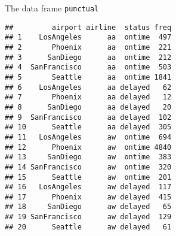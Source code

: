 \begin{frame}[fragile]{The data frame \texttt{punctual}}

  {\footnotesize
\begin{knitrout}
\color{fgcolor}\begin{kframe}
\begin{verbatim}
##         airport airline  status freq
## 1    LosAngeles      aa  ontime  497
## 2       Phoenix      aa  ontime  221
## 3      SanDiego      aa  ontime  212
## 4  SanFrancisco      aa  ontime  503
## 5       Seattle      aa  ontime 1841
## 6    LosAngeles      aa delayed   62
## 7       Phoenix      aa delayed   12
## 8      SanDiego      aa delayed   20
## 9  SanFrancisco      aa delayed  102
## 10      Seattle      aa delayed  305
## 11   LosAngeles      aw  ontime  694
## 12      Phoenix      aw  ontime 4840
## 13     SanDiego      aw  ontime  383
## 14 SanFrancisco      aw  ontime  320
## 15      Seattle      aw  ontime  201
## 16   LosAngeles      aw delayed  117
## 17      Phoenix      aw delayed  415
## 18     SanDiego      aw delayed   65
## 19 SanFrancisco      aw delayed  129
## 20      Seattle      aw delayed   61
\end{verbatim}
\end{kframe}
\end{knitrout}
}
  
\end{frame}

